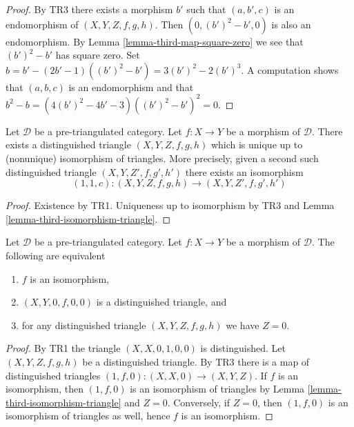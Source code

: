 \begin{proof}
By TR3 there exists a morphism $b'$ such that
$(a, b', c)$ is an endomorphism of $(X, Y, Z, f, g, h)$.
Then $(0, (b')^2 - b', 0)$ is also an endomorphism. By
Lemma \ref{lemma-third-map-square-zero}
we see that $(b')^2 - b'$ has square zero.
Set $b = b' - (2b' - 1)((b')^2 - b') = 3(b')^2 - 2(b')^3$.
A computation shows that $(a, b, c)$ is an endomorphism and
that $b^2 - b = (4(b')^2 - 4b' - 3)((b')^2 - b')^2 = 0$.
\end{proof}

\begin{lemma}
\label{lemma-cone-triangle-unique-isomorphism}
Let $\mathcal{D}$ be a pre-triangulated category.
Let $f : X \to Y$ be a morphism of $\mathcal{D}$.
There exists a distinguished triangle $(X, Y, Z, f, g, h)$ which
is unique up to (nonunique) isomorphism of triangles.
More precisely, given a second such distinguished triangle
$(X, Y, Z', f, g', h')$ there exists an isomorphism
$$
(1, 1, c) : (X, Y, Z, f, g, h) \longrightarrow (X, Y, Z', f, g', h')
$$
\end{lemma}

\begin{proof}
Existence by TR1. Uniqueness up to isomorphism by TR3 and
Lemma \ref{lemma-third-isomorphism-triangle}.
\end{proof}

\begin{lemma}
\label{lemma-third-object-zero}
Let $\mathcal{D}$ be a pre-triangulated category.
Let $f : X \to Y$ be a morphism of $\mathcal{D}$.
The following are equivalent
\begin{enumerate}
\item $f$ is an isomorphism,
\item $(X, Y, 0, f, 0, 0)$ is a distinguished triangle, and
\item for any distinguished triangle $(X, Y, Z, f, g, h)$ we have $Z = 0$.
\end{enumerate}
\end{lemma}

\begin{proof}
By TR1 the triangle $(X, X, 0, 1, 0, 0)$ is distinguished.
Let $(X, Y, Z, f, g, h)$ be a distinguished triangle.
By TR3 there is a map of distinguished triangles
$(1, f, 0) : (X, X, 0) \to (X, Y, Z)$.
If $f$ is an isomorphism, then $(1, f, 0)$ is an isomorphism
of triangles by Lemma \ref{lemma-third-isomorphism-triangle}
and $Z = 0$. Conversely, if $Z = 0$, then $(1, f, 0)$ is an
isomorphism of triangles as well, hence $f$ is an isomorphism.
\end{proof}

